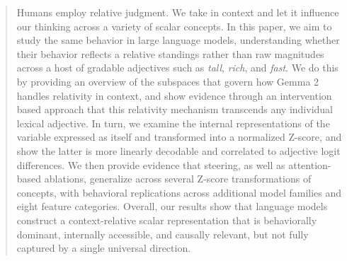 \documentclass{article}
\begin{document}

\printAffiliationsAndNotice{}


\begin{abstract}
Humans employ relative judgment. We take in context and let it influence our thinking across a variety of scalar concepts. In this paper, we aim to study the same behavior in large language models, understanding whether their behavior reflects a relative standings rather than raw magnitudes across a host of gradable adjectives such as \emph{tall}, \emph{rich}, and \emph{fast}.
We do this by providing an overview of the subspaces that govern how Gemma 2 handles relativity in context, and show evidence through an intervention based approach that this relativity mechanism transcends any individual lexical adjective.
In turn, we examine the internal representations of the variable expressed as itself and transformed into a normalized Z-score, and show the latter is more linearly decodable and correlated to adjective logit differences.
We then provide evidence that steering, as well as attention-based ablations, generalize across several Z-score transformations of concepts, with behavioral replications across additional model families and eight feature categories.
Overall, our results show that language models construct a context-relative scalar representation that is behaviorally dominant, internally accessible, and causally relevant, but not fully captured by a single universal direction.
\end{abstract}
\end{document}
